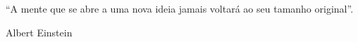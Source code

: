 \begin{flushright}
\begin{minipage}[r]{10cm}
\vspace{18cm}
``A mente que se abre a uma nova ideia jamais voltará ao seu tamanho original''.
\begin{flushright}
Albert Einstein
\end{flushright}
\end{minipage}
\end{flushright}
